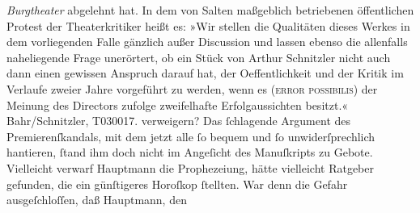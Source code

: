 \begin{ledgroupsized}[t]{13cm}
{{{{{                        \emph{Burgtheater} abgelehnt hat. In dem von Salten maßgeblich betriebenen öffentlichen
                     Protest der Theaterkritiker heißt es: »Wir stellen die Qualitäten dieses
                        Werkes in dem vorliegenden Falle gänzlich außer Discussion und lassen ebenso
                        die allenfalls naheliegende Frage unerörtert, ob ein Stück von Arthur Schnitzler nicht auch dann einen gewissen Anspruch darauf hat, der
                        Oeffentlichkeit und der Kritik im Verlaufe zweier Jahre vorgeführt zu
                        werden, wenn es (\textsc{error possibilis}) der Meinung des Directors zufolge
                        zweifelhafte Erfolgaussichten besitzt.« Bahr/Schnitzler, T030017.
                  }}}\label{K_L03438-4h} verweigern? Das
                  ſchlagende Argument des Premierenſkandals, mit dem jetzt alle ſo bequem und ſo
                  unwiderſprechlich hantieren, ſtand ihm doch nicht im Angeſicht des Manuſkripts zu Gebote. Vielleicht
                  verwarf Hauptmann die Prophezeiung, hätte
                  vielleicht Ratgeber gefunden, die ein günſtigeres Horoſkop ſtellten. War denn die
                  Gefahr ausgeſchloſſen, daß Hauptmann, den
}}
\end{ledgroupsized}
